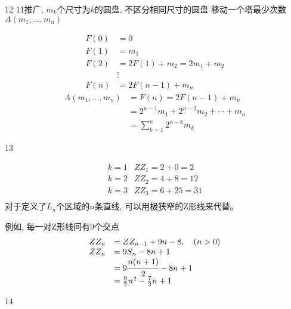 \begin{exercise}
	12 11推广,	$ m_k $个尺寸为$ k $的圆盘, 不区分相同尺寸的圆盘
	移动一个塔最少次数 $ A(m_1, \dots, m_n) $
\end{exercise}

\begin{answer}
	\begin{align*}
		F(0) 	&= 0	\\
		F(1) 	&= m_1	\\
		F(2) 	&= 2F(1)+m_2 = 2m_1+m_2	\\
				&\vdots	\\
		F(n)	&= 2F(n-1)+m_n
	\end{align*}
	\begin{align*}
		A(m_1, \dots, m_n) 
		&= F(n) = 2F(n-1)+m_n\\
		&= 2^{n-1}m_1+2^{n-2}m_2+\cdots+m_n\\
		&= \sum_{k=1}^{n} 2^{n-k} m_{k}
	\end{align*}
\end{answer}

\begin{exercise}
	13
\end{exercise}

\begin{answer}
	\begin{equation*}
		\begin{array}{ll}
			k=1 & ZZ_1 = 2+0 = 2\\
			k=2	& ZZ_2 = 4+8 = 12\\
			k=3	& ZZ_3 = 6+25 = 31\\
		\end{array}
	\end{equation*}
对于定义了$ L_n $个区域的$ n $条直线, 
可以用极狭窄的Z形线来代替。

例如, 每一对Z形线间有9个交点
\begin{equation}
	\begin{array}{ll}
		ZZ_n 	&= ZZ_{n-1}+9n-8,\quad (n>0)\\
		ZZ_n	&= 9S_n - 8n+1\\
				&= 9\cfrac{n(n+1)}{2} - 8n+1\\
				&= \frac{9}{2}n^2 - \frac{7}{2}n + 1\\
	\end{array}
\end{equation}
\end{answer}

\begin{exercise}
	14
\end{exercise}

